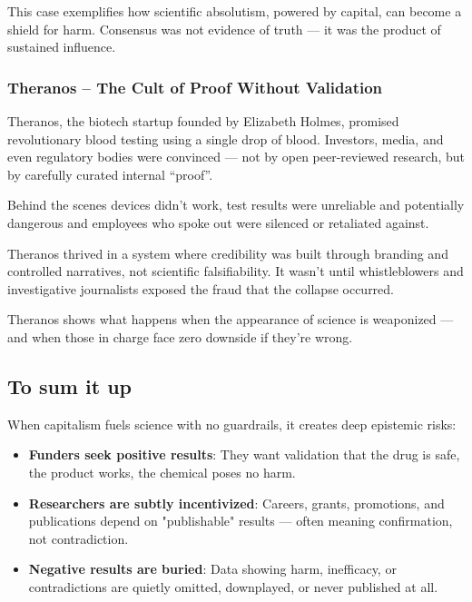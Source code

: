This case exemplifies how scientific absolutism, powered by capital, can become a shield for harm. Consensus was not evidence of truth — it was the product of sustained influence.

\cite{GLENNA2021104290}
\cite{mindthegap2020}
\cite{ehn2018}

\subsubsection{Theranos – The Cult of Proof Without Validation}

Theranos, the biotech startup founded by Elizabeth Holmes, promised revolutionary blood testing using a single drop of blood. Investors, media, and even regulatory bodies were convinced — not by open peer-reviewed research, but by carefully curated internal “proof”.

Behind the scenes devices didn't work, test results were unreliable and potentially dangerous and employees who spoke out were silenced or retaliated against.

Theranos thrived in a system where credibility was built through branding and controlled narratives, not scientific falsifiability. It wasn't until whistleblowers and investigative journalists exposed the fraud that the collapse occurred.

Theranos shows what happens when the appearance of science is weaponized — and when those in charge face zero downside if they’re wrong.

\cite{USvsHolmes2022}
\cite{buzzfeednews2018}
\cite{justivegove-theranos}

\subsection{To sum it up}

When capitalism fuels science with no guardrails, it creates deep epistemic risks:
\begin{itemize}
	\item \textbf{Funders seek positive results}: They want validation that the drug is safe, the product works, the chemical poses no harm.
	\item \textbf{Researchers are subtly incentivized}: Careers, grants, promotions, and publications depend on "publishable" results — often meaning confirmation, not contradiction.
	\item \textbf{Negative results are buried}: Data showing harm, inefficacy, or contradictions are quietly omitted, downplayed, or never published at all.
\end{itemize}

